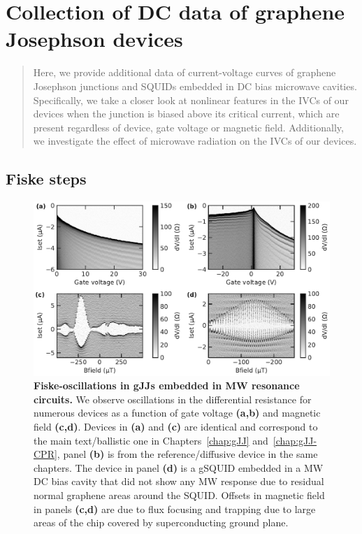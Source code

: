 \newchapstyle
\chapter{Collection of DC data of graphene Josephson devices}
\label{chap:gJJ-misc}

%
%
\begin{abstract}
	\color{title}
	Here, we provide additional data of current-voltage curves of graphene Josephson junctions and SQUIDs embedded in DC bias microwave cavities.
	Specifically, we take a closer look at nonlinear features in the IVCs of our devices when the junction is biased above its critical current, which are present regardless of device, gate voltage or magnetic field.
	Additionally, we investigate the effect of microwave radiation on the IVCs of our devices.
\end{abstract}

\afterpage{\pagecolor{none}}\newpage

\section{Fiske steps}\label{sec:fiske}

\begin{figure}[b]
	\centering
	\includegraphics[width=\linewidth]{appendix/gJJ-misc-figs/fig_IVosc}
	\caption{
		\textbf{Fiske-oscillations in gJJs embedded in MW resonance circuits.}
		We observe oscillations in the differential resistance for numerous devices as a function of gate voltage \textbf{(a,b)} and magnetic field \textbf{(c,d)}.
		Devices in \textbf{(a)} and \textbf{(c)} are identical and correspond to the main text/ballistic one in Chapters~\ref{chap:gJJ} and~\ref{chap:gJJ-CPR}, panel \textbf{(b)} is from the reference/diffusive device in the same chapters.
		The device in panel \textbf{(d)} is a gSQUID embedded in a MW DC bias cavity that did not show any MW response due to residual normal graphene areas around the SQUID.
		Offsets in magnetic field in panels \textbf{(c,d)} are due to flux focusing and trapping due to large areas of the chip covered by superconducting ground plane.
	}
	\label{fig:IVoscillations}
\end{figure}

